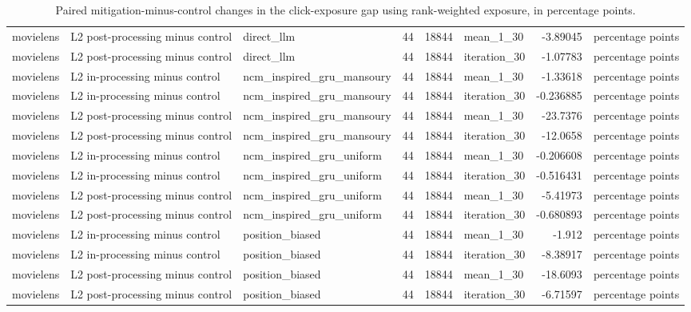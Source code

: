\begin{table}[htbp!]
\begin{tabular}{lllrrlrl}
movielens & L2 post-processing minus control & direct\_llm & 44 & 18844 & mean\_1\_30 & -3.89045 & percentage points \\
movielens & L2 post-processing minus control & direct\_llm & 44 & 18844 & iteration\_30 & -1.07783 & percentage points \\
movielens & L2 in-processing minus control & ncm\_inspired\_gru\_mansoury & 44 & 18844 & mean\_1\_30 & -1.33618 & percentage points \\
movielens & L2 in-processing minus control & ncm\_inspired\_gru\_mansoury & 44 & 18844 & iteration\_30 & -0.236885 & percentage points \\
movielens & L2 post-processing minus control & ncm\_inspired\_gru\_mansoury & 44 & 18844 & mean\_1\_30 & -23.7376 & percentage points \\
movielens & L2 post-processing minus control & ncm\_inspired\_gru\_mansoury & 44 & 18844 & iteration\_30 & -12.0658 & percentage points \\
movielens & L2 in-processing minus control & ncm\_inspired\_gru\_uniform & 44 & 18844 & mean\_1\_30 & -0.206608 & percentage points \\
movielens & L2 in-processing minus control & ncm\_inspired\_gru\_uniform & 44 & 18844 & iteration\_30 & -0.516431 & percentage points \\
movielens & L2 post-processing minus control & ncm\_inspired\_gru\_uniform & 44 & 18844 & mean\_1\_30 & -5.41973 & percentage points \\
movielens & L2 post-processing minus control & ncm\_inspired\_gru\_uniform & 44 & 18844 & iteration\_30 & -0.680893 & percentage points \\
movielens & L2 in-processing minus control & position\_biased & 44 & 18844 & mean\_1\_30 & -1.912 & percentage points \\
movielens & L2 in-processing minus control & position\_biased & 44 & 18844 & iteration\_30 & -8.38917 & percentage points \\
movielens & L2 post-processing minus control & position\_biased & 44 & 18844 & mean\_1\_30 & -18.6093 & percentage points \\
movielens & L2 post-processing minus control & position\_biased & 44 & 18844 & iteration\_30 & -6.71597 & percentage points \\
\hline
\end{tabular}
\caption{Paired mitigation-minus-control changes in the click-exposure gap using rank-weighted exposure, in percentage points.}
\label{chap:results:tab:rq4_weighted_gap_effects}
\end{table}
